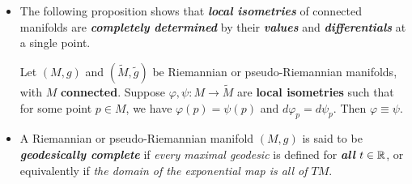 \documentclass[11pt]{article}
\begin{document}
\begin{itemize}
\item The following proposition shows that \emph{\textbf{local isometries}} of connected manifolds are \emph{\textbf{completely determined}} by their \emph{\textbf{values}} and \emph{\textbf{differentials}} at a single point.
\begin{proposition}
Let $(M, g)$ and $(\widetilde{M},\widetilde{g})$ be Riemannian or pseudo-Riemannian manifolds, with $M$ \textbf{connected}. Suppose $\varphi, \psi: M \rightarrow \widetilde{M}$ are \textbf{local isometries} such that for some point $p \in M$, we have $\varphi(p) = \psi(p)$ and $d\varphi_p = d\psi_p$. Then $\varphi \equiv \psi$.
\end{proposition}

\item \begin{definition}
A Riemannian or pseudo-Riemannian manifold  $(M, g)$ is said to be \emph{\textbf{geodesically complete}} if \emph{every maximal geodesic} is defined for \emph{\textbf{all}} $t \in {\mathbb R}$, or equivalently if \emph{the domain of the exponential map is all of $TM$}. 
\end{definition}
\end{itemize}
\end{document}
